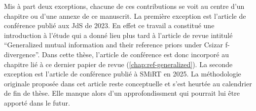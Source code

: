 Mis à part deux exceptions, chacune de ces contributions se voit au centre d'un chapitre ou d'une annexe de ce manuscrit.
La première exception est l'article de conférence publié aux JdS de 2023. En effet ce travail a constitué une introduction à l'étude qui a donné lieu plus tard à l'article de revue intitulé ``Generalized mutual information and their reference priors under Csizar f-divergence''. Dans cette thèse, l'article de conférence est donc incorporé au chapitre lié à ce dernier papier de revue (\cref{chap:ref-generalized}).
La seconde exception est l'article de conférence publié à SMiRT en 2025. La méthodologie originale proposée dans cet article reste conceptuelle et s'est heurtée au calendrier de fin de thèse. %
Elle manque alors d'un approfondissment qui pourrait lui être apporté dans le futur.


%
%
% 
%





































\newpage
\thispagestyle{plain}
\renewcommand{\chaptertitlenamelng}{Chapter}
\renewcommand{\partname}{Part}